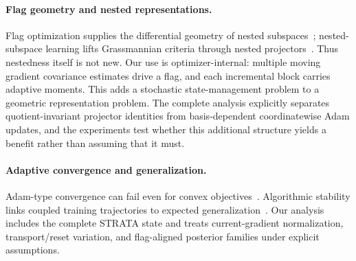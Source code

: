 \paragraph{Flag geometry and nested representations.}
Flag optimization supplies the differential geometry of nested subspaces~\cite{lai2022simpler}; nested-subspace learning lifts Grassmannian criteria through nested projectors~\cite{szwagier2025nested}. Thus nestedness itself is not new. Our use is optimizer-internal: multiple moving gradient covariance estimates drive a flag, and each incremental block carries adaptive moments. This adds a stochastic state-management problem to a geometric representation problem. The complete analysis explicitly separates quotient-invariant projector identities from basis-dependent coordinatewise Adam updates, and the experiments test whether this additional structure yields a benefit rather than assuming that it must.

\paragraph{Adaptive convergence and generalization.}
Adam-type convergence can fail even for convex objectives~\citep{reddi2018adam}. Algorithmic stability links coupled training trajectories to expected generalization~\citep{hardt2016train}. Our analysis includes the complete STRATA state and treats current-gradient normalization, transport/reset variation, and flag-aligned posterior families under explicit assumptions.
